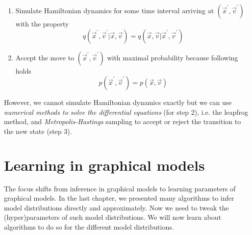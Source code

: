 \begin{minipage}[t]{1\textwidth}
\begin{minipage}[t]{.48\textwidth}
{{\begin{enumerate}
				\item Simulate Hamiltonian dynamics for some time interval arriving at \ensuremath{(\vec{x}^\prime,\vec{v}^\prime)} with the property \begin{equation} q(\vec{x}^\prime, \vec{v}^\prime | \vec{x}, \vec{v}) = q(\vec{x}, \vec{v} | \vec{x}^\prime, \vec{v}^\prime) \end{equation}
				\item Accept the move to \ensuremath{(\vec{x}^\prime,\vec{v}^\prime)} with maximal probability because following holds \begin{equation} p(\vec{x}^\prime, \vec{v}^\prime) = p(\vec{x}, \vec{v}) \end{equation}
			\end{enumerate}
			However, we cannot simulate Hamiltonian dynamics exactly but we can use \emph{numerical methods to solve the differential equations} (for step 2), i.e. the leapfrog method, and \emph{Metropolis-Hastings} sampling to accept or reject the transition to the new state (step 3). %
		}}%
	\end{minipage}
\end{minipage}
%
%
%
\section{Learning in graphical models}
The focus shifts from inference in graphical models to learning parameters of graphical models. %
In the last chapter, we presented many algorithms to infer model distributions directly and approximately. %
Now we need to tweak the (hyper)parameters of such model distributions. %
We will now learn about algorithms to do so for the different model distributions. %
%
%
%
